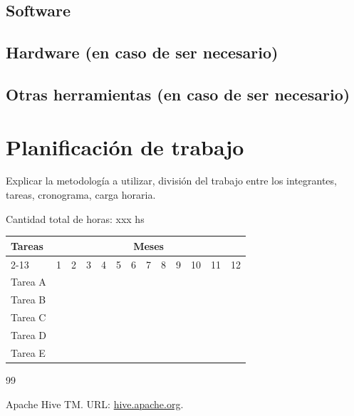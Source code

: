 \documentclass[12pt]{article}
\begin{document}
\subsection{Software}

\subsection{Hardware (en caso de ser necesario)}

\subsection{Otras herramientas (en caso de ser necesario)}

\bigskip




\section{Planificación de trabajo}

Explicar la metodología a utilizar, división del trabajo entre los integrantes, tareas, cronograma, carga horaria.

Cantidad total de horas: xxx hs

\bigskip

\begin{center}
\def\arraystretch{1.5}
\begin{tabular}{ |l|c|c|c|c|c|c|c|c|c|c|c|c| }

 \hline
 \multirow{2}{1em}{Tareas} & \multicolumn{12}{|c|}{Meses}\\  \cline{2-13} &
     1 & 2 & 3 & 4 & 5 & 6 & 7 & 8 & 9 & 10 & 11 & 12 \\  \hline
 Tarea A & \cellcolor{gray} & \cellcolor{gray} &  &  &  &  &  &  &  &  &  &   \\ 
 \hline
Tarea B &  & \cellcolor{gray} & \cellcolor{gray} &  &  &  &  &  &  &  &  &   \\ 
 \hline
Tarea C &  & \cellcolor{gray} & \cellcolor{gray} & \cellcolor{gray} & \cellcolor{gray} & \cellcolor{gray} & &  &  &  &  &   \\ 
 \hline
Tarea D &  &  &  &  &  &  &  &  &  & &  &   \\ 
 \hline
Tarea E &  &  &  &  &  &  &  & & & \cellcolor{gray} & \cellcolor{gray} & \cellcolor{gray}    \\ 
 \hline
\end{tabular}
\end{center}

\bigskip






\begin{thebibliography}{99}

      Apache Hive TM. URL: \url{hive.apache.org}.

\end{thebibliography}
\end{document}
